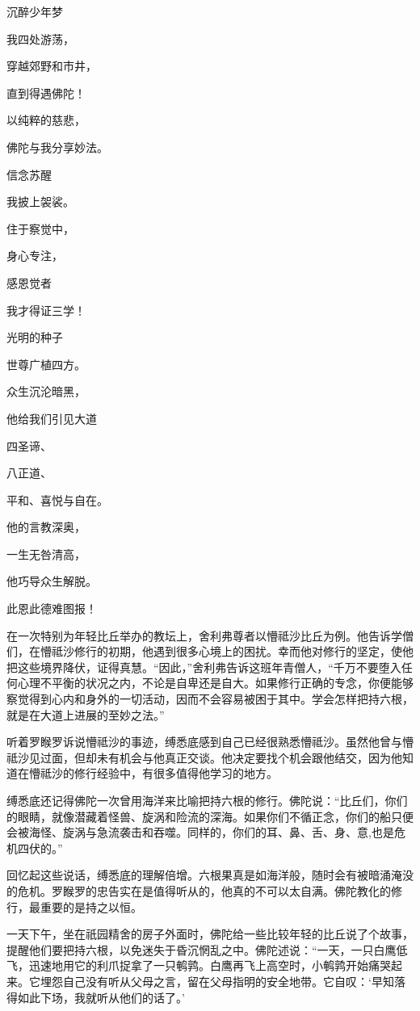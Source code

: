 \documentclass[12pt,twoside,openany]{book}
\newcommand{\kai}[1]{{\CJKfamily{kai}#1}}
\begin{document}
\kai{沉醉少年梦

我四处游荡，

穿越郊野和市井，

直到得遇佛陀！

以纯粹的慈悲，

佛陀与我分享妙法。

信念苏醒

我披上袈裟。

住于察觉中，

身心专注，

感恩觉者

我才得证三学！

光明的种子

世尊广植四方。

众生沉沦暗黑，

他给我们引见大道

四圣谛、

八正道、

平和、喜悦与自在。

他的言教深奥，

一生无咎清高，

他巧导众生解脱。

此恩此德难图报！}

在一次特别为年轻比丘举办的教坛上，舍利弗尊者以懵祗沙比丘为例。他告诉学僧们，在懵祗沙修行的初期，他遇到很多心境上的困扰。幸而他对修行的坚定，使他把这些境界降伏，证得真慧。“因此，”舍利弗告诉这班年青僧人，“千万不要堕入任何心理不平衡的状况之内，不论是自卑还是自大。如果修行正确的专念，你便能够察觉得到心内和身外的一切活动，因而不会容易被困于其中。学会怎样把持六根，就是在大道上进展的至妙之法。”

听着罗睺罗诉说懵祗沙的事迹，缚悉底感到自己已经很熟悉懵祗沙。虽然他曾与懵祗沙见过面，但却未有机会与他真正交谈。他决定要找个机会跟他结交，因为他知道在懵祗沙的修行经验中，有很多值得他学习的地方。

缚悉底还记得佛陀一次曾用海洋来比喻把持六根的修行。佛陀说：“比丘们，你们的眼睛，就像潜藏着怪兽、旋涡和险流的深海。如果你们不循正念，你们的船只便会被海怪、旋涡与急流袭击和吞噬。同样的，你们的耳、鼻、舌、身、意,也是危机四伏的。”

回忆起这些说话，缚悉底的理解倍增。六根果真是如海洋般，随时会有被暗涌淹没的危机。罗睺罗的忠告实在是值得听从的，他真的不可以太自满。佛陀教化的修行，最重要的是持之以恒。

一天下午，坐在祇园精舍的房子外面时，佛陀给一些比较年轻的比丘说了个故事，提醒他们要把持六根，以免迷失于昏沉惘乱之中。佛陀述说：“一天，一只白鹰低飞，迅速地用它的利爪捉拿了一只鹌鹑。白鹰再飞上高空时，小鹌鹑开始痛哭起来。它埋怨自己没有听从父母之言，留在父母指明的安全地带。它自叹：‘早知落得如此下场，我就听从他们的话了。’
\end{document}
